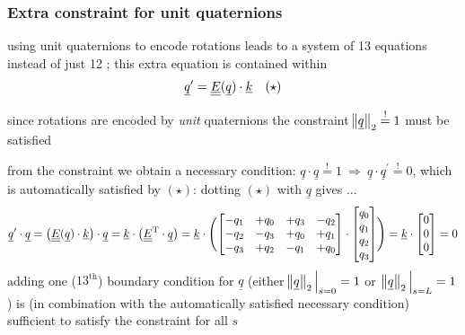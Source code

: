 \begin{frame}
  \frametitle{Extra constraint for unit quaternions}
  
  using unit quaternions to encode rotations leads to a system of 13 equations \newline
  instead of just 12 ; this extra equation is contained within
  \begin{displaymath}
    \underline{q}^{\prime} = \underline{\underline{E}}(\underline{q}) \cdot \underline{k} \quad (\star)
  \end{displaymath}
  
  since rotations are encoded by \textit{unit} quaternions the constraint $\norm[1]{\underline{q}}_{2} \overset{!}{=} 1$ must be satisfied
  
  from the constraint we obtain a necessary condition: $\underline{q} \cdot \underline{q} \overset{!}{=} 1 \: \Rightarrow \: \underline{q} \cdot \underline{q}^{\prime} \overset{!}{=} 0$, which is automatically satisfied by $(\star)$: \quad dotting $(\star)$ with $\underline{q}$ gives ...
  \begin{displaymath}
    \underline{q}^{\prime} \cdot \underline{q} =
    \bigl( \underline{\underline{E}}(\underline{q}) \cdot \underline{k} \bigr) \cdot \underline{q} =
    \underline{k} \cdot \bigl( \underline{\underline{E}}^{\mathrm{T}} \cdot \underline{q} \bigr) =
    \underline{k} \cdot \Biggl(
    \begin{bmatrix}
      -q_1 & +q_0 & +q_3 & -q_2\\
      -q_2 & -q_3 & +q_0 & +q_1\\
      -q_3 & +q_2 & -q_1 & +q_0
    \end{bmatrix} \cdot
    \begin{bmatrix}
      q_0 \\ q_1 \\ q_2 \\ q_3
    \end{bmatrix}
    \Biggr) =
    \underline{k} \cdot
    \begin{bmatrix}
      0 \\ 0 \\ 0
    \end{bmatrix} = 0
  \end{displaymath}
  adding one ($13^{\text{th}}$) boundary condition for $\underline{q}$ (either $\norm[1]{\underline{q}}_{2} \sVert[2]_{s=0} = 1$ or $\: \norm[1]{\underline{q}}_{2} \sVert[2]_{s=L} = 1$) is (in combination with the automatically satisfied necessary condition) sufficient to satisfy the constraint for all $s$
\end{frame}


